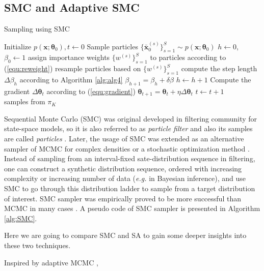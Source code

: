 \documentclass{article} %
\begin{document}
\subsection{SMC and Adaptive SMC}
\begin{algorithm} [!t]                    
\caption{Sampling using SMC}          
\label{alg:SMC}                           
\begin{algorithmic}[1]
\STATE Initialize $p(\mathbf{x};\boldsymbol{\theta}_0), t\gets 0$
\STATE Sample particles $\{\bar{\mathbf{x}}_0^{(s)}\}_{s=1}^S\sim p(\mathbf{x};\boldsymbol{\theta}_0)$
\STATE $h\gets 0$, $\beta_0\gets 1$
\STATE assign importance weights $\{w^{(s)}\}_{s=1}^S$ to particles according to (\ref{equ:reweight})
\STATE resample particles based on $\{w^{(s)}\}_{s=1}^S$
\STATE compute the step length $\Delta\beta_h$ according to Algorithm \ref{alg:alg4}
\STATE $\beta_{h+1}=\beta_h+\delta\beta$
\STATE $h\gets h+1$
\ENDWHILE
\STATE Compute the gradient $\Delta\boldsymbol{\theta}_t$ according to (\ref{equ:gradient})
\STATE $\boldsymbol{\theta}_{t+1}=\boldsymbol{\theta}_{t}+\eta\Delta\boldsymbol{\theta}_t$
\STATE $t\gets t+1$
\ENDWHILE
\ENSURE ~~\ %
samples from $\pi_{K}$ 
\end{algorithmic}
\end{algorithm}
Sequential Monte Carlo (SMC) was original developed in filtering community for state-space models, so it is also referred to as \emph{particle filter} 
and also its samples are called \emph{particles} \cite{gordon_PF}. 
Later, the usage of SMC was extended as an alternative sampler of MCMC for complex densities or a stochastic optimization method \cite{SMC_sampler, chopin_2002_SA,2_SMC_4_optimization}. 
Instead of sampling from an interval-fixed sate-distribution sequence in filtering, one can construct a synthetic distribution sequence, ordered with 
increasing complexity or increasing number of data (\emph{e.g.} in Bayesian inference), and use SMC to go through this distribution ladder to sample from a 
target distribution of interest. SMC sampler was empirically proved to be more successful than MCMC in many cases \cite{chopin_2002_SA,2_SMC_4_optimization,Xiong-2014-ACML}. A pseudo code 
of SMC sampler is presented in Algorithm \ref{alg:SMC}.

Here we are going to compare SMC and SA to gain some deeper insights into these two techniques.   

Inspired by adaptive MCMC \cite{adaptive_MCMC},     
\end{document}
